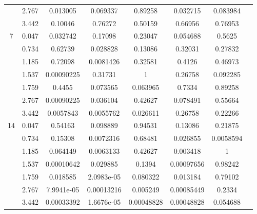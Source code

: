 \begin{table}[H]
\begin{center}
\begin{tabular}{cccccccc}
           & 2.767       & 0.013005                    & 0.069337                  & 0.89258                   & 0.032715          & 0.083984 \\
           & 3.442        & 0.10046                     & 0.76272                   & 0.50159                   & 0.66956           & 0.76953 \\
         7 & 0.047     & 0.032742                    & 0.17098                   & 0.23047                   & 0.054688          & 0.5625 \\
           & 0.734      & 0.62739                     & 0.028828                  & 0.13086                   & 0.32031           & 0.27832 \\
           & 1.185       & 0.72098                     & 0.0081426                 & 0.32581                   & 0.4126            & 0.46973 \\
           & 1.537       & 0.00090225                  & 0.31731                   & 1                         & 0.26758           & 0.092285 \\
           & 1.759        & 0.4455                      & 0.073565                  & 0.063965                  & 0.7334            & 0.89258 \\
           & 2.767       & 0.00090225                  & 0.036104                  & 0.42627                   & 0.078491          & 0.55664 \\
           & 3.442        & 0.0057843                   & 0.0055762                 & 0.026611                  & 0.26758           & 0.22266 \\
        14 & 0.047     & 0.54163                     & 0.098889                  & 0.94531                   & 0.13086           & 0.21875 \\
           & 0.734      & 0.15308                     & 0.0072316                 & 0.68481                   & 0.026855          & 0.0058594 \\
           & 1.185       & 0.064149           & 0.0063133                 & 0.42627                   & 0.003418          & 1 \\
           & 1.537       & 0.00010642         & 0.029885                  & 0.1394                    & 0.00097656        & 0.98242 \\
           & 1.759        & 0.018585           & 2.0983e-05                & 0.080322                  & 0.013184          & 0.79102 \\
           & 2.767       & 7.9941e-05         & 0.00013216                & 0.005249                  & 0.00085449        & 0.2334 \\
           & 3.442        & 0.00033392         & 1.6676e-05                & 0.00048828                & 0.00048828        & 0.054688 \\
      \bottomrule
    \end{tabular}
  \end{center}
\end{table}

